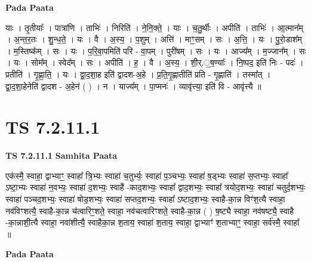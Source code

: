 \documentclass[17pt]{extarticle}
\begin{document}
\textbf{Pada Paata} \newline

याः । तृ॒तीयाः᳚ । पात्रा॑णि । ताभिः॑ । निरिति॑ । ने॒नि॒क्ते॒ । याः । च॒तु॒र्थीः । अपीति॑ । ताभिः॑ । आ॒त्मान᳚म् । अ॒न्त॒र॒तः । शु॒न्ध॒ते॒ । यः । वै । अ॒स्य॒ । प॒शुम् । अत्ति॑ । माꣳ॒॒सम् । सः । अ॒त्ति॒ । यः । पु॒रो॒डाश᳚म् । म॒स्तिष्क᳚म् । सः । यः । प॒रि॒वा॒पमिति॑ परि - वा॒पम् । पुरी॑षम् । सः । यः । आज्य᳚म् । म॒ज्जान᳚म् । सः । यः । सोम᳚म् । स्वेद᳚म् । सः । अपीति॑ । ह॒ । वै । अ॒स्य॒ । शी॒र्.॒ष॒ण्याः᳚ । नि॒ष्पद॒ इति॑ निः - पदः॑ । प्रतीति॑ । गृ॒ह्णा॒ति॒ । यः । द्वा॒द॒शा॒ह इति॑ द्वादश-अ॒हे । प्र॒ति॒गृ॒ह्णातीति॑ प्रति - गृ॒ह्णाति॑ । तस्मा᳚त् । द्वा॒द॒शा॒हेनेति॑ द्वादश - अ॒हेन॑ ( ) । न । याज्य᳚म् । पा॒प्मनः॑ । व्यावृ॑त्त्या॒ इति॑ वि - आवृ॑त्त्यै ॥  \newline





\section{ TS 7.2.11.1 }

\textbf{TS 7.2.11.1 } \newline
\textbf{Samhita Paata} \newline

एक॑स्मै॒ स्वाहा॒ द्वाभ्याꣳ॒॒ स्वाहा᳚ त्रि॒भ्यः स्वाहा॑ च॒तुर्भ्यः॒ स्वाहा॑ प॒ञ्चभ्यः॒ स्वाहा॑ ष॒ड्भ्यः स्वाहा॑ स॒प्तभ्यः॒ स्वाहा᳚ ऽष्टा॒भ्यः स्वाहा॑ न॒वभ्यः॒ स्वाहा॑ द॒शभ्यः॒ स्वाहै॑ -काद॒शभ्यः॒ स्वाहा᳚ द्वाद॒शभ्यः॒ स्वाहा᳚ त्रयोद॒शभ्यः॒ स्वाहा॑ चतुर्द॒शभ्यः॒ स्वाहा॑ पञ्चद॒शभ्यः॒ स्वाहा॑ षोड॒शभ्यः॒ स्वाहा॑ सप्तद॒शभ्यः॒ स्वाहा᳚ ऽष्टाद॒शभ्यः॒ स्वाहै-का॒न्न विꣳ॑श॒त्यै स्वाहा॒ नव॑विꣳशत्यै॒ स्वाहै-का॒न्न च॑त्वारिꣳ॒॒शते॒ स्वाहा॒ नव॑चत्वारिꣳशते॒ स्वाहै-का॒न्न ( ) ष॒ष्ट्यै स्वाहा॒ नव॑षष्ट्यै॒ स्वाहै -का॒न्नाशी॒त्यै स्वाहा॒ नवा॑शीत्यै॒ स्वाहैका॒न्न श॒ताय॒ स्वाहा॑ श॒ताय॒ स्वाहा॒ द्वाभ्याꣳ॑ श॒ताभ्याꣳ॒॒ स्वाहा॒ सर्व॑स्मै॒ स्वाहा᳚ ॥ \newline

\textbf{Pada Paata} \newline
\end{document}
